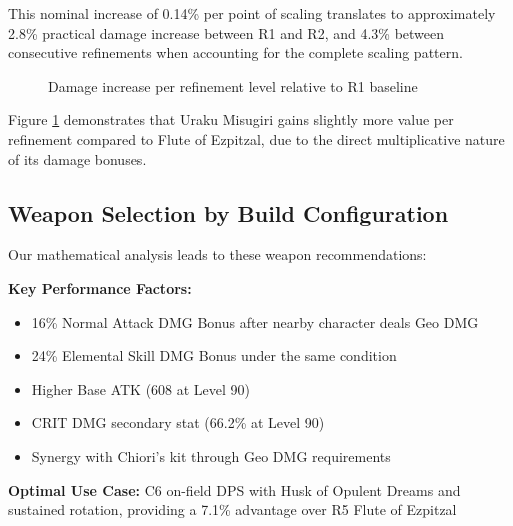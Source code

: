 \documentclass[12pt,a4paper]{article}
\begin{document}
This nominal increase of 0.14\% per point of scaling translates to approximately 2.8\% practical damage increase between R1 and R2, and 4.3\% between consecutive refinements when accounting for the complete scaling pattern.

\begin{figure}[H]
\centering
{}
\caption{Damage increase per refinement level relative to R1 baseline}
\label{fig:refinement_value}
\end{figure}

Figure \ref{fig:refinement_value} demonstrates that Uraku Misugiri gains slightly more value per refinement compared to Flute of Ezpitzal, due to the direct multiplicative nature of its damage bonuses.

\subsection{Weapon Selection by Build Configuration}

Our mathematical analysis leads to these weapon recommendations:

\begin{tcolorbox}[colback=geodark!5, colframe=geodark, title=Uraku Misugiri (R1)]
\textbf{Key Performance Factors:}
\begin{itemize}
    \item 16\% Normal Attack DMG Bonus after nearby character deals Geo DMG
    \item 24\% Elemental Skill DMG Bonus under the same condition
    \item Higher Base ATK (608 at Level 90)
    \item CRIT DMG secondary stat (66.2\% at Level 90)
    \item Synergy with Chiori's kit through Geo DMG requirements
\end{itemize}

\textbf{Optimal Use Case:} C6 on-field DPS with Husk of Opulent Dreams and sustained rotation, providing a 7.1\% advantage over R5 Flute of Ezpitzal
\end{tcolorbox}
\end{document}

